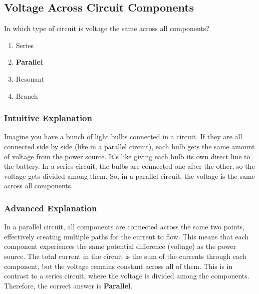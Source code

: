 \subsection{Voltage Across Circuit Components}
\label{T5D14}

\begin{tcolorbox}[colback=gray!10!white,colframe=black!75!black,title=T5D14]
In which type of circuit is voltage the same across all components?
\begin{enumerate}[noitemsep]
    \item Series
    \item \textbf{Parallel}
    \item Resonant
    \item Branch
\end{enumerate}
\end{tcolorbox}

\subsubsection*{Intuitive Explanation}
Imagine you have a bunch of light bulbs connected in a circuit. If they are all connected side by side (like in a parallel circuit), each bulb gets the same amount of voltage from the power source. It's like giving each bulb its own direct line to the battery. In a series circuit, the bulbs are connected one after the other, so the voltage gets divided among them. So, in a parallel circuit, the voltage is the same across all components.

\subsubsection*{Advanced Explanation}
In a parallel circuit, all components are connected across the same two points, effectively creating multiple paths for the current to flow. This means that each component experiences the same potential difference (voltage) as the power source. The total current in the circuit is the sum of the currents through each component, but the voltage remains constant across all of them. This is in contrast to a series circuit, where the voltage is divided among the components. Therefore, the correct answer is \textbf{Parallel}.